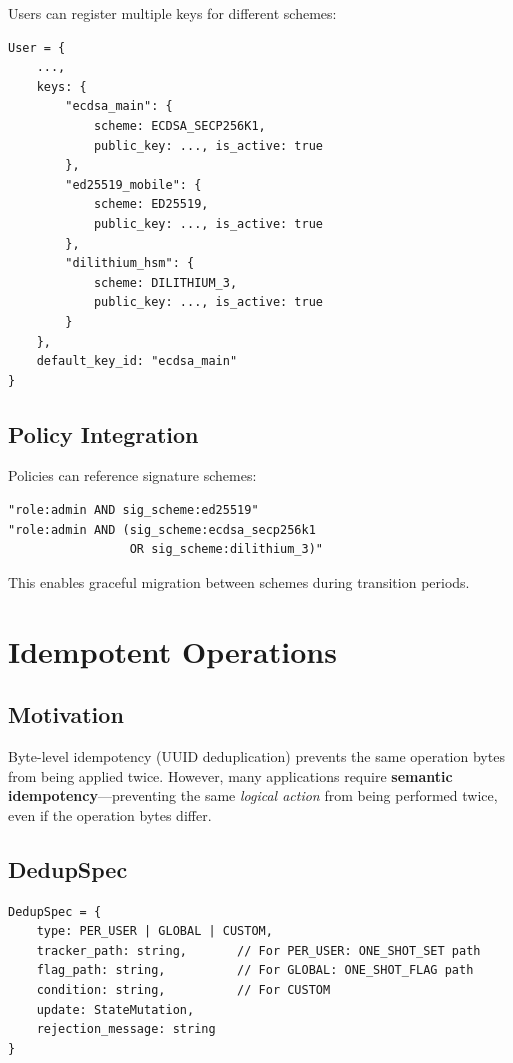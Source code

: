 \documentclass[11pt,a4paper]{article}
\begin{document}
Users can register multiple keys for different schemes:

\begin{lstlisting}
User = {
    ...,
    keys: {
        "ecdsa_main": {
            scheme: ECDSA_SECP256K1,
            public_key: ..., is_active: true
        },
        "ed25519_mobile": {
            scheme: ED25519,
            public_key: ..., is_active: true
        },
        "dilithium_hsm": {
            scheme: DILITHIUM_3,
            public_key: ..., is_active: true
        }
    },
    default_key_id: "ecdsa_main"
}
\end{lstlisting}

\subsection{Policy Integration}

Policies can reference signature schemes:

\begin{lstlisting}
"role:admin AND sig_scheme:ed25519"
"role:admin AND (sig_scheme:ecdsa_secp256k1
                 OR sig_scheme:dilithium_3)"
\end{lstlisting}

This enables graceful migration between schemes during transition periods.

\section{Idempotent Operations}

\subsection{Motivation}

Byte-level idempotency (UUID deduplication) prevents the same operation bytes from being applied twice. However, many applications require \textbf{semantic idempotency}---preventing the same \textit{logical action} from being performed twice, even if the operation bytes differ.

\subsection{DedupSpec}

\begin{lstlisting}
DedupSpec = {
    type: PER_USER | GLOBAL | CUSTOM,
    tracker_path: string,       // For PER_USER: ONE_SHOT_SET path
    flag_path: string,          // For GLOBAL: ONE_SHOT_FLAG path
    condition: string,          // For CUSTOM
    update: StateMutation,
    rejection_message: string
}
\end{lstlisting}
\end{document}
